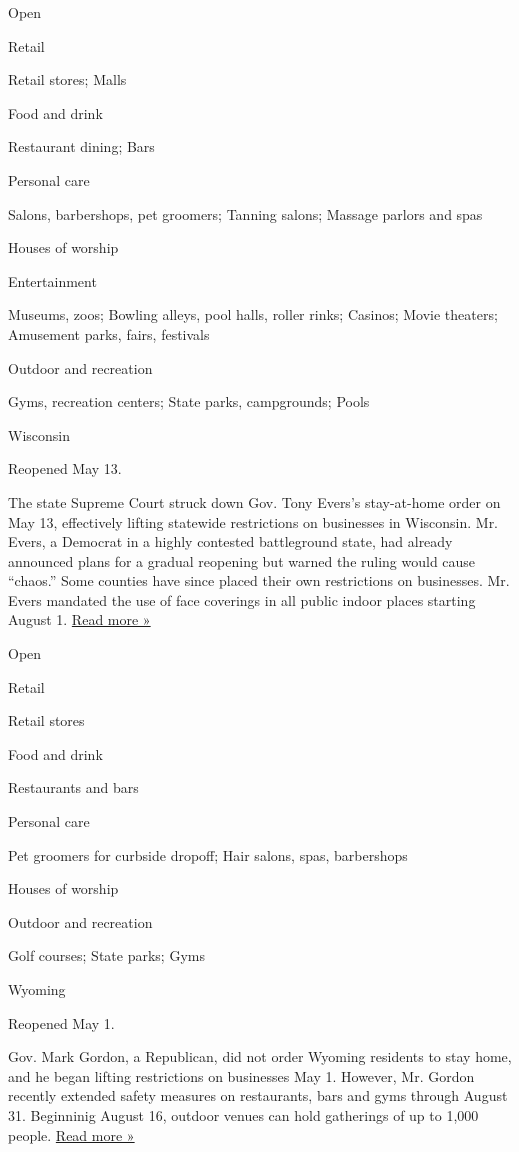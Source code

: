 Open

Retail

Retail stores; Malls

Food and drink

Restaurant dining; Bars

Personal care

Salons, barbershops, pet groomers; Tanning salons; Massage parlors and
spas

Houses of worship

Entertainment

Museums, zoos; Bowling alleys, pool halls, roller rinks; Casinos; Movie
theaters; Amusement parks, fairs, festivals

Outdoor and recreation

Gyms, recreation centers; State parks, campgrounds; Pools

Wisconsin

Reopened May 13.

The state Supreme Court struck down Gov. Tony Evers's stay-at-home order
on May 13, effectively lifting statewide restrictions on businesses in
Wisconsin. Mr. Evers, a Democrat in a highly contested battleground
state, had already announced plans for a gradual reopening but warned
the ruling would cause ``chaos.'' Some counties have since placed their
own restrictions on businesses. Mr. Evers mandated the use of face
coverings in all public indoor places starting August 1.
\href{https://www.jsonline.com/story/news/2020/05/14/wisconsin-bars-hair-salons-dine-restaurants-open-after-supreme-court-ruling-stay-home-order-evers/5194195002/}{Read
more »}

Open

Retail

Retail stores

Food and drink

Restaurants and bars

Personal care

Pet groomers for curbside dropoff; Hair salons, spas, barbershops

Houses of worship

Outdoor and recreation

Golf courses; State parks; Gyms

Wyoming

Reopened May 1.

Gov. Mark Gordon, a Republican, did not order Wyoming residents to stay
home, and he began lifting restrictions on businesses May 1. However,
Mr. Gordon recently extended safety measures on restaurants, bars and
gyms through August 31. Beginninig August 16, outdoor venues can hold
gatherings of up to 1,000 people.
\href{https://www.wyomingpublicmedia.org/post/larger-outdoor-gatherings-allowed-housing-assistance-expands-aid\#stream/0}{Read
more »}

